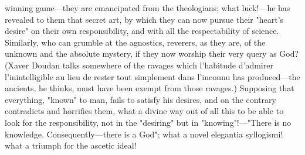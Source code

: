\documentclass[12pt]{article}
\begin{document}
winning game---they are emancipated from the theologians; what luck!---he has revealed to them that secret art, by which they can now pursue their "heart's desire" on their own responsibility, and with all the respectability of science. Similarly, who can grumble at the agnostics, reverers, as they are, of the unknown and the absolute mystery, if they now worship their very query as God? (Xaver Doudan talks somewhere of the ravages which l'habitude d'admirer l'inintelligible au lieu de rester tout simplement dans l'inconnu has produced---the ancients, he thinks, must have been exempt from those ravages.) Supposing that everything, "known" to man, fails to satisfy his desires, and on the contrary contradicts and horrifies them, what a divine way out of all this to be able to look for the responsibility, not in the "desiring" but in "knowing"!---"There is no knowledge. Consequently---there is a God"; what a novel elegantia syllogismi! what a triumph for the ascetic ideal!
\end{document}
